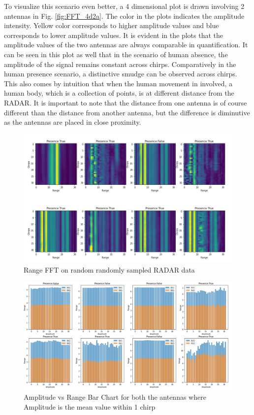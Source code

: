 To visualize this scenario even better, a 4 dimensional plot is drawn involving 2 antennas in Fig. \ref{fig:FFT_4d2a}. The color in the plots indicates the amplitude intensity. Yellow color corresponds to higher amplitude values and blue corresponds to lower amplitude values. It is evident in the plots that the amplitude values of the two antennas are always comparable in quantification. It can be seen in this plot as well that in the scenario of human absence, the amplitude of the signal remains constant across chirps. Comparatively in the human presence scenario, a distinctive smudge can be observed across chirps. This also comes by intuition that when the human movement in involved, a human body, which is a collection of points, is at different distance from the RADAR. It is important to note that the distance from one antenna is of course different than the distance from another antenna, but the difference is diminutive as the antennas are placed in close proximity.
\begin{figure}[ht]
  \begin{center}
    \includegraphics[width=01\textwidth]{Master's thesis/images/fft_1_antenna.PNG} 
    \caption{Range FFT on random randomly sampled RADAR data}
    \label{fig:FFT_plot}
  \end{center}
\end{figure}  
\begin{figure}[ht]
  \begin{center}
    \includegraphics[width=01\textwidth]{Master's thesis/images/ff_bar.png} 
    \caption{Amplitude vs Range Bar Chart for both the antennas where Amplitude is the mean value within 1 chirp}
    \label{fig:FFT_bar}
  \end{center}
\end{figure}
